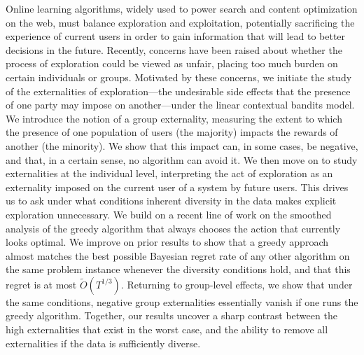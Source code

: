 Online learning algorithms, widely used to power search and content optimization on the web, must balance exploration and exploitation, potentially sacrificing the experience of current users in order to gain information that will lead to better decisions in the future.  Recently, concerns have been raised about whether the process of exploration could be viewed as unfair, placing too much burden on certain individuals or groups.  Motivated by these concerns, we initiate the study of the externalities of exploration---the undesirable side effects that the presence of one party may impose on another---under the linear contextual bandits model.  We introduce the notion of a group externality, measuring the extent to which the presence of one population of users (the majority) impacts the rewards of another (the minority). We show that this impact can, in some cases, be negative, and that, in a certain sense, no algorithm can avoid it.  We then move on to study externalities at the individual level, interpreting the act of exploration as an externality imposed on the current user of a system by future users. This drives us to ask under what conditions inherent diversity in the data makes explicit exploration unnecessary.  We build on a recent line of work on the smoothed analysis of the greedy algorithm that always chooses the action that currently looks optimal. We improve on prior results to show that a greedy approach almost matches the best possible Bayesian regret rate of any other algorithm on the same problem instance whenever the diversity conditions hold, and that this regret is at most $\tilde{O}(T^{1/3})$. Returning to group-level effects, we show that under the same conditions, negative group externalities essentially vanish if one runs the greedy algorithm. Together, our results uncover a sharp contrast between the high externalities that exist in the worst case, and the ability to remove all externalities if the data is sufficiently diverse. 